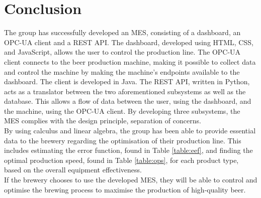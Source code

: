 \section{Conclusion}
The group has successfully developed an MES, consisting of a dashboard, an
OPC-UA client and a REST API. The dashboard, developed using HTML, CSS, and
JavaScript, allows the user to control the production line. The OPC-UA client
connects to the beer production machine, making it possible to collect data and
control the machine by making the machine's endpoints available to the
dashboard. The client is developed in Java. The REST API, written in Python,
acts as a translator between the two aforementioned subsystems as well as the
database. This allows a flow of data between the user, using the dashboard, and
the machine, using the OPC-UA client. By developing three subsystems, the MES 
complies with the design principle, separation of concerns. \\

By using calculus and linear algebra, the group has been able to provide essential
data to the brewery regarding the optimisation of their production line. This
includes estimating the error function, found in Table \ref{table:eef}, and
finding the optimal production speed, found in Table \ref{table:ops}, for each
product type, based on the overall equipment effectiveness. \\

If the brewery chooses to use the developed MES, they will be able to control
and optimise the brewing process to maximise the production of high-quality beer.